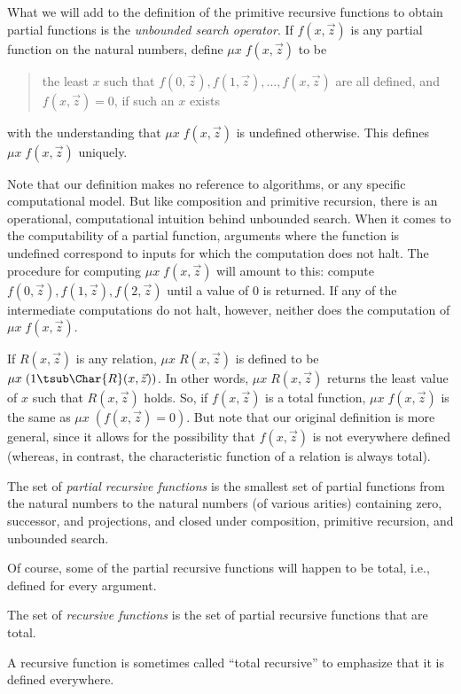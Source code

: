 \documentclass[../../../include/open-logic-section]{subfiles}
\begin{document}
What we will add to the definition of the primitive recursive
functions to obtain partial functions is the \emph{unbounded search
  operator}. If $f(x,\vec z)$ is any partial function on the natural
numbers, define $\mu x \; f(x,\vec z)$ to be
\begin{quote}
  the least $x$ such that $f(0,\vec z), f(1,\vec z), \dots, f(x,\vec
  z)$ are all defined, and $f(x,\vec z) = 0$, if such an $x$ exists
\end{quote}
with the understanding that $\mu x \; f(x,\vec z)$ is undefined
otherwise. This defines $\mu x \; f(x,\vec z)$ uniquely.

\begin{explain}
Note that our definition makes no reference to algorithms, or any specific computational model. But
like composition and primitive recursion, there is an operational,
computational intuition behind unbounded search. When it
comes to the computability of a partial function, arguments
where the function is undefined correspond to inputs for which the
computation does not halt. The procedure for computing $\mu x \;
f(x,\vec z)$ will amount to this: compute $f(0,\vec z), f(1,\vec z),
f(2,\vec z)$ until a value of 0 is returned. If any of the
intermediate computations do not halt, however, neither does the
computation of $\mu x \; f(x,\vec z)$.
\end{explain}

If $R(x,\vec z)$ is any relation, $\mu x \; R(x,\vec z)$ is defined to
be $\mu x \; (1 \tsub \Char{R}(x,\vec z))$. In other words, $\mu x \;
R(x,\vec z)$ returns the least value of $x$ such that $R(x,\vec z)$
holds. So, if $f(x,\vec z)$ is a total function, $\mu x \; f(x,\vec
z)$ is the same as $\mu x \; (f(x,\vec z) = 0)$. But note that our
original definition is more general, since it allows for the
possibility that $f(x,\vec z)$ is not everywhere defined (whereas, in
contrast, the characteristic function of a relation is always total).

\begin{defn}
The set of \emph{partial recursive functions} is the smallest set of
partial functions from the natural numbers to the natural numbers (of
various arities) containing zero, successor, and projections, and
closed under composition, primitive recursion, and unbounded search.
\end{defn}

Of course, some of the partial recursive functions will happen to be
total, i.e., defined for every argument.

\begin{defn}
The set of \emph{recursive functions} is
the set of partial recursive functions that are total.
\end{defn}

A recursive function is sometimes called ``total recursive'' to
emphasize that it is defined everywhere.
\end{document}

